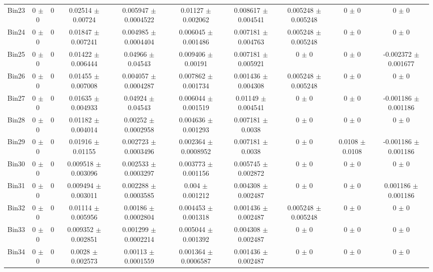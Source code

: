 \begin{tabular}{@{\extracolsep{4pt}}lccccccccc@{}}
     Bin23 & 0 $\pm$ 0 & 0 & 0.02514 $\pm$ 0.00724 & 0.005947 $\pm$ 0.0004522 & 0.01127 $\pm$ 0.002062 & 0.008617 $\pm$ 0.004541 & 0.005248 $\pm$ 0.005248 & 0 $\pm$ 0 & 0 $\pm$ 0 \\ 
     Bin24 & 0 $\pm$ 0 & 0 & 0.01847 $\pm$ 0.007241 & 0.004985 $\pm$ 0.0004404 & 0.006045 $\pm$ 0.001486 & 0.007181 $\pm$ 0.004763 & 0.005248 $\pm$ 0.005248 & 0 $\pm$ 0 & 0 $\pm$ 0 \\ 
     Bin25 & 0 $\pm$ 0 & 0 & 0.01422 $\pm$ 0.006444 & 0.04966 $\pm$ 0.04543 & 0.009406 $\pm$ 0.00191 & 0.007181 $\pm$ 0.005921 & 0 $\pm$ 0 & 0 $\pm$ 0 & -0.002372 $\pm$ 0.001677 \\ 
     Bin26 & 0 $\pm$ 0 & 0 & 0.01455 $\pm$ 0.007008 & 0.004057 $\pm$ 0.0004287 & 0.007862 $\pm$ 0.001734 & 0.001436 $\pm$ 0.004308 & 0.005248 $\pm$ 0.005248 & 0 $\pm$ 0 & 0 $\pm$ 0 \\ 
     Bin27 & 0 $\pm$ 0 & 0 & 0.01635 $\pm$ 0.004933 & 0.04924 $\pm$ 0.04543 & 0.006044 $\pm$ 0.001519 & 0.01149 $\pm$ 0.004541 & 0 $\pm$ 0 & 0 $\pm$ 0 & -0.001186 $\pm$ 0.001186 \\ 
     Bin28 & 0 $\pm$ 0 & 0 & 0.01182 $\pm$ 0.004014 & 0.00252 $\pm$ 0.0002958 & 0.004636 $\pm$ 0.001293 & 0.007181 $\pm$ 0.0038 & 0 $\pm$ 0 & 0 $\pm$ 0 & 0 $\pm$ 0 \\ 
     Bin29 & 0 $\pm$ 0 & 0 & 0.01916 $\pm$ 0.01155 & 0.002723 $\pm$ 0.0003496 & 0.002364 $\pm$ 0.0008952 & 0.007181 $\pm$ 0.0038 & 0 $\pm$ 0 & 0.0108 $\pm$ 0.0108 & -0.001186 $\pm$ 0.001186 \\ 
     Bin30 & 0 $\pm$ 0 & 0 & 0.009518 $\pm$ 0.003096 & 0.002533 $\pm$ 0.0003297 & 0.003773 $\pm$ 0.001156 & 0.005745 $\pm$ 0.002872 & 0 $\pm$ 0 & 0 $\pm$ 0 & 0 $\pm$ 0 \\ 
     Bin31 & 0 $\pm$ 0 & 0 & 0.009494 $\pm$ 0.003011 & 0.002288 $\pm$ 0.0003585 & 0.004 $\pm$ 0.001212 & 0.004308 $\pm$ 0.002487 & 0 $\pm$ 0 & 0 $\pm$ 0 & 0.001186 $\pm$ 0.001186 \\ 
     Bin32 & 0 $\pm$ 0 & 0 & 0.01114 $\pm$ 0.005956 & 0.00186 $\pm$ 0.0002804 & 0.004453 $\pm$ 0.001318 & 0.001436 $\pm$ 0.002487 & 0.005248 $\pm$ 0.005248 & 0 $\pm$ 0 & 0 $\pm$ 0 \\ 
     Bin33 & 0 $\pm$ 0 & 0 & 0.009352 $\pm$ 0.002851 & 0.001299 $\pm$ 0.0002214 & 0.005044 $\pm$ 0.001392 & 0.004308 $\pm$ 0.002487 & 0 $\pm$ 0 & 0 $\pm$ 0 & 0 $\pm$ 0 \\ 
     Bin34 & 0 $\pm$ 0 & 0 & 0.0028 $\pm$ 0.002573 & 0.00113 $\pm$ 0.0001559 & 0.001364 $\pm$ 0.0006587 & 0.001436 $\pm$ 0.002487 & 0 $\pm$ 0 & 0 $\pm$ 0 & 0 $\pm$ 0 \\ 

\end{tabular}
